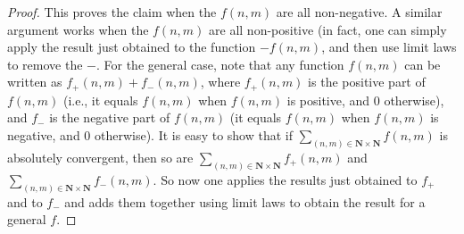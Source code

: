 \begin{proof}
This proves the claim when the \(f(n, m)\) are all non-negative.
A similar argument works when the \(f(n, m)\) are all non-positive
(in fact, one can simply apply the result just obtained to the function \(-f(n, m)\), and then use limit laws to remove the \(-\).
For the general case, note that any function \(f(n, m)\) can be written as \(f_+(n, m) + f_-(n, m)\), where \(f_+(n, m)\) is the positive part of \(f(n, m)\)
(i.e., it equals \(f(n, m)\) when \(f(n, m)\) is positive, and \(0\) otherwise),
and \(f_-\) is the negative part of \(f(n, m)\)
(it equals \(f(n, m)\) when \(f(n, m)\) is negative, and \(0\) otherwise).
It is easy to show that if \(\sum_{(n, m) \in \mathbf{N} \times \mathbf{N}} f(n, m)\) is absolutely convergent, then so are \(\sum_{(n, m) \in \mathbf{N} \times \mathbf{N}} f_+(n, m)\) and \(\sum_{(n, m) \in \mathbf{N} \times \mathbf{N}} f_-(n, m)\).
So now one applies the results just obtained to \(f_+\) and to \(f_-\) and adds them together using limit laws to obtain the result for a general \(f\).
\end{proof}